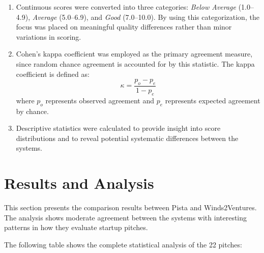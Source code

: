 \begin{enumerate}
    \item Continuous scores were converted into three categories: 
    \textit{Below Average} (1.0--4.9), \textit{Average} (5.0--6.9), 
    and \textit{Good} (7.0--10.0). By using this categorization, 
    the focus was placed on meaningful quality differences rather than minor variations in scoring.

    \item Cohen’s kappa coefficient was employed as the primary
    agreement measure, since random chance agreement is accounted for by
    this statistic. The kappa coefficient is defined as:
    \[
    \kappa = \frac{p_o - p_e}{1 - p_e}
    \]
    where $p_o$ represents observed agreement and $p_e$ represents
    expected agreement by chance.

    \item Descriptive statistics were calculated to provide insight into score distributions and to reveal potential systematic differences  between the systems.
\end{enumerate}


\section{Results and Analysis}
\label{sec:inter-rater-reliability}

This section presents the comparison results between Pista and Winds2Ventures. The analysis shows moderate agreement between the systems with interesting patterns in how they evaluate startup pitches.

The following table shows the complete statistical analysis of the 22 pitches:

